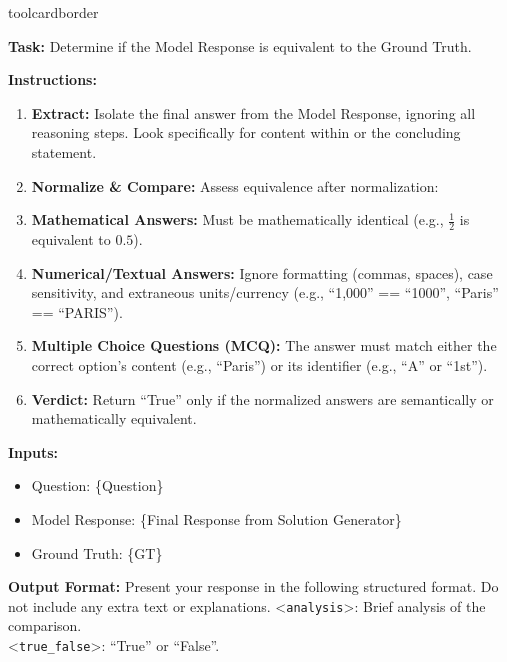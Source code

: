 \begin{custombox}[title=Reward Function Instruction in Training]{toolcardborder}
\setlength{\parindent}{0pt}

\textbf{Task:} Determine if the Model Response is equivalent to the Ground Truth.

\vspace{6pt}

\noindent\textbf{Instructions:}
\begin{enumerate}[left=0pt]
    \item \textbf{Extract:} Isolate the final answer from the Model Response, ignoring all reasoning steps. Look specifically for content within  or the concluding statement.
    \item \textbf{Normalize \& Compare:} Assess equivalence after normalization:
    \item \textbf{Mathematical Answers:} Must be mathematically identical (e.g., $\frac{1}{2}$ is equivalent to $0.5$).
        \item \textbf{Numerical/Textual Answers:} Ignore formatting (commas, spaces), case sensitivity, and extraneous units/currency (e.g., ``1,000'' == ``1000'', ``Paris'' == ``PARIS'').
        \item \textbf{Multiple Choice Questions (MCQ):} The answer must match either the correct option's content (e.g., ``Paris'') or its identifier (e.g., ``A'' or ``1st'').
    \item \textbf{Verdict:} Return ``True'' only if the normalized answers are semantically or mathematically equivalent.
\end{enumerate}

\vspace{6pt}

\noindent\textbf{Inputs:}
\begin{itemize}[left=0pt, label={}, itemsep=0pt, parsep=0pt]
\item {Question:} {\{{Question}\}}

    \item {Model Response:} {\{{Final Response} {from Solution Generator}\}}

   \item {Ground Truth:} {\{{GT}\}}
\end{itemize}

\vspace{6pt}

\noindent\textbf{Output Format:}
Present your response in the following structured format. Do not include any extra text or explanations.
\textless{}\texttt{analysis}\textgreater{}: Brief analysis of the comparison.\\
\textless{}\texttt{true\_false}\textgreater{}: ``True'' or ``False''.
\end{custombox}

